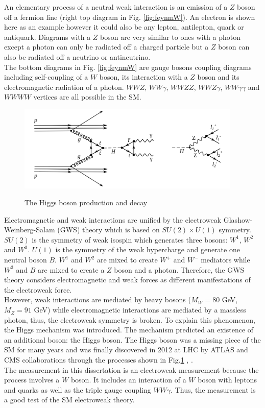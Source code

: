 An elementary process of a neutral weak interaction is an emission of a $Z$ boson off a fermion line (right top diagram in Fig. \ref{fig:feynmW}). An electron is shown here as an example however it could also be any lepton, antilepton, quark or antiquark. Diagrams with a $Z$ boson are very similar to ones with a photon except a photon can only be radiated off a charged particle but a $Z$ boson can also be radiated off a neutrino or antineutrino.\\

The bottom diagrams in Fig. \ref{fig:feynmW} are gauge bosons coupling diagrams including self-coupling of a $W$ boson, its interaction with a $Z$ boson and its electromagnetic radiation of a photon. $WWZ$, $WW\gamma$, $WWZZ$, $WWZ\gamma$, $WW\gamma\gamma$ and $WWWW$ vertices are all possible in the SM.\\

\begin{figure}[htb]
  \begin{center}
    {\includegraphics[width=0.95\textwidth]{../figs/Intro/FeynmanHiggs.png}}
    \caption{The Higgs boson production and decay}
    \label{fig:higgsProduction}
  \end{center}
\end{figure}

Electromagnetic and weak interactions are unified by the electroweak Glashow-Weinberg-Salam (GWS) theory which is based on $SU(2) \times U(1)$ symmetry. $SU(2)$ is the symmetry of weak isospin which generates three bosons: $W^1$, $W^2$ and $W^3$. $U(1)$ is the symmetry of the weak hypercharge and generate one neutral boson $B$. $W^1$ and $W^2$ are mixed to create $W^+$ and $W^-$ mediators while $W^3$ and $B$ are mixed to create a $Z$ boson and a photon. Therefore, the GWS theory considers electromagnetic and weak forces as different manifestations of the electroweak force. \\

However, weak interactions are mediated by heavy bosons ($M_W=80$ GeV, $M_Z=91$ GeV) while electromagnetic interactions are mediated by a massless photon, thus, the electroweak symmetry is broken. To explain this phenomenon, the Higgs mechanism was introduced. The mechanism predicted an existence of an additional boson: the Higgs boson. The Higgs boson was a missing piece of the SM for many years and was finally discovered in 2012 at LHC by ATLAS and CMS collaborations through the processes shown in Fig.\ref{fig:higgsProduction} \cite{ref_HiggsPaperCMS}, \cite{ref_HiggsPaperATLAS}.\\


The measurement in this dissertation is an electroweak measurement because the process involves a $W$ boson. It includes an interaction of a $W$ boson with leptons and quarks as well as the triple gauge coupling $WW\gamma$. Thus, the measurement is a good test of the SM electroweak theory.\\ 



